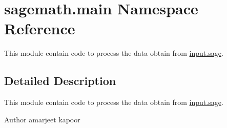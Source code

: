 \hypertarget{namespacesagemath_1_1main}{}\section{sagemath.\+main Namespace Reference}
\label{namespacesagemath_1_1main}


This module contain code to process the data obtain from \hyperlink{input_8sage}{input.\+sage}.  




\subsection{Detailed Description}
This module contain code to process the data obtain from \hyperlink{input_8sage}{input.\+sage}. 

\begin{DoxyAuthor}{Author}
amarjeet kapoor 
\end{DoxyAuthor}
